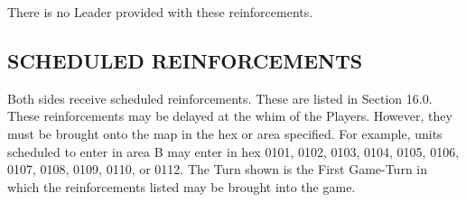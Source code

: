 \subsubsection{} There is no Leader provided with these reinforcements.

\begin{flushleft}
  \subsection{SCHEDULED REINFORCEMENTS}
\end{flushleft}

Both sides receive scheduled reinforcements. These are listed in Section 16.0. These reinforcements may be delayed at the whim of the Players. However, they must be brought onto the map in the hex or area specified. For example, units scheduled to enter in area B may enter in hex 0101, 0102, 0103, 0104, 0105, 0106, 0107, 0108, 0109, 0110, or 0112. The Turn shown is the First Game-Turn in which the reinforcements listed may be brought into the game.